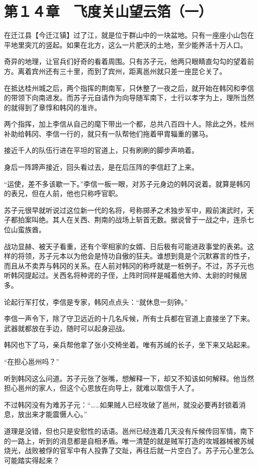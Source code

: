 \section{第１４章　飞度关山望云箔（一）}

在迁江县【今迁江镇】过了江，就是位于群山中的一块盆地。只有一座座小山包在平地里突兀的竖起。如果在北方，这么一片肥沃的土地，至少能养活十万人口。

奇异的地理，让官兵们好奇的看着周围。只有苏子元，他两只眼睛直勾勾的望着前方。离着宾州还有三十里，而到了宾州，距离邕州就只差一座昆仑关了。

在抵达桂州城之后，两个指挥的荆南军，只休整了一夜之后，就开始在韩冈和李信的带领下向南进发。而苏子元自请作为向导随军南下，士行以孝字为上，理所当然的就得到了章惇和韩冈的准许。

两个指挥，加上李信从自己的麾下带出一个都，总共八百四十人。除此之外，桂州补助给韩冈、李信一行的，就只有一队帮他们拖着甲胄辎重的骡马。

接近千人的队伍行进在平坦的官道上，只有刷刷的脚步声响着。

身后一阵蹄声接近，回头看过去，是在后压阵的李信赶了上来。

“运使，差不多该歇一下。”李信一板一眼，对苏子元身边的韩冈说着。就算是韩冈的表兄，但在人前，他也只称呼官职。

苏子元很早就听说过这位新一代的名将，号称掷矛之术独步军中，殿前演武时，天子都拍案叫绝。其人在关西、荆南的战场上斩首无数。据说曾于一战之中，连杀七位山蛮族酋。

战功显赫、被天子看重，还有个宰相家的女婿、日后极有可能进政事堂的表弟。这样的将领，苏子元本以为他会是恃功自傲的狂夫。谁想到竟是个沉默寡言的性子，而且从不卖弄与韩冈的关系。在人前对韩冈的称呼就是一桩例子。不过，苏子元也听韩冈提起过。关西名将种谔的子侄，上阵时同样是喊着他大帅、太尉的时候居多。

论起行军打仗，李信是专家，韩冈点点头：“就休息一刻钟。”

李信一声令下，除了守卫远近的十几名斥候，所有士兵都在官道上直接坐了下来。武器就都放在手边，随时可以起身迎战。

韩冈也下了马，亲兵帮他拿了张小交椅坐着。唯有苏缄的长子，坐下来又站起来。

“在担心邕州吗？”

听到韩冈这么问道。苏子元张了张嘴，想解释一下，却又不知该如何解释。他当然担心邕州的家人，但这个心思放在向导上，就难以取信于人了。

不过韩冈没有为难苏子元：“……如果贼人已经攻破了邕州，就没必要再封锁着消息，放出来才能震慑人心。”

道理是没错，但也只是安慰性的话语。邕州已经连着几天没有斥候传回军情，南下的一路上，听到的消息都是自相矛盾。唯一清楚的就是贼军打造的攻城器械被苏缄烧光，战败被俘的官军中有人投靠了交趾，再往后就一片空白了。苏子元心里怎么可能踏实得起来？

